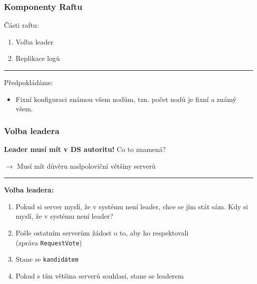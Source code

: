 \documentclass[usenames,dvipsnames,9pt]{beamer}
\begin{document}
\begin{frame}
  \frametitle{Komponenty Raftu}
  {\Large Části raftu:}
    \begin{enumerate}
      \item Volba leader
      \item Replikace logů
    \end{enumerate}
  \pause

  \vspace{2em}\hrule\vspace{2em}

  {\Large Předpokládáme:}

  \begin{itemize}
    \item Fixní konfiguraci známou všem nodům, tzn. počet nodů je fixní a známý všem.
  \end{itemize}
\end{frame}

\begin{frame}
  \frametitle{Volba leadera}

  {\Large \textbf{\faWarning \hspace{3pt} Leader musí mít v DS autoritu!} \hfill Co to znamená?}

  \pause\hspace{20pt} $\rightarrow$ Musí mít důvěru nadpoloviční většiny serverů

  \vspace{2em}\hrule\vspace{2em}

  \textbf{Volba leadera:}
  \begin{enumerate}
    \item Pokud si server myslí, že v systému není leader, chce se jím stát sám.
          \hfill Kdy si myslí, že v systému není leader?
    \pause
    \item Pošle ostatním serverům žádost o to, aby ho respektovali \\
          (zpráva \texttt{RequestVote})

    \item Stane se \texttt{kandidátem}

    \pause
    \item Pokud s tím většina serverů souhlasí, stane se leaderem
  \end{enumerate}
\end{frame}
\end{document}
